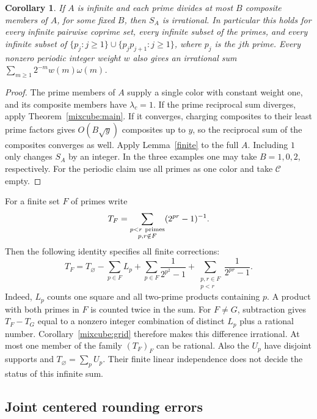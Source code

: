 \documentclass[11pt,letterpaper]{article}
\newtheorem{corollary}[theorem]{Corollary}
\begin{document}
\begin{corollary}\label{mixcube:incidence}
If $A$ is infinite and each prime divides at most $B$ composite
members of $A$, for some fixed $B$, then $S_A$ is irrational.
In particular this holds for every infinite pairwise coprime set,
every infinite subset of the primes, and every infinite subset of
$\{p_j:j\ge1\}\cup\{p_jp_{j+1}:j\ge1\}$, where $p_j$ is the $j$th
prime. Every nonzero periodic integer weight $w$ also gives an
irrational sum $\sum_{m\ge1}2^{-m}w(m)\omega(m)$.
\end{corollary}
\begin{proof}
The prime members of $A$ supply a single color with constant weight one, and
its composite members have $\lambda_c=1$. If the prime reciprocal sum
diverges, apply Theorem~\ref{mixcube:main}. If it converges, charging
composites to their least prime factors gives $O(B\sqrt y)$ composites
up to $y$, so the reciprocal sum of the composites converges as well.
Apply Lemma~\ref{finite} to the full $A$. Including $1$
only changes $S_A$ by an integer. In the three examples one may take
$B=1,0,2$, respectively. For the periodic claim use all primes as one
color and take $\mathcal C$ empty.
\end{proof}

For a finite set $F$ of primes write
\[
 T_F=\sum_{\substack{p<r\ {\rm primes}\\p,r\notin F}}(2^{pr}-1)^{-1}.
\]
Then the following identity specifies all finite corrections:
\[
 T_F=T_{\varnothing}-\sum_{p\in F}L_p
       +\sum_{p\in F}\frac1{2^{p^2}-1}
       +\sum_{\substack{p,r\in F\\p<r}}\frac1{2^{pr}-1}.
\]
Indeed, $L_p$ counts one square and all two-prime products containing
$p$. A product with both primes in $F$ is counted twice in the sum.
For $F\ne G$, subtraction gives $T_F-T_G$ equal to a nonzero
integer combination of distinct $L_p$ plus a rational number.
Corollary~\ref{mixcube:grid} therefore makes this difference irrational.
At most one member of the family $(T_F)_F$ can be rational. Also the
$U_p$ have disjoint supports and $T_{\varnothing}=\sum_pU_p$.
Their finite linear independence does not decide the status of this
infinite sum.

\subsection{Joint centered rounding errors}
\end{document}
